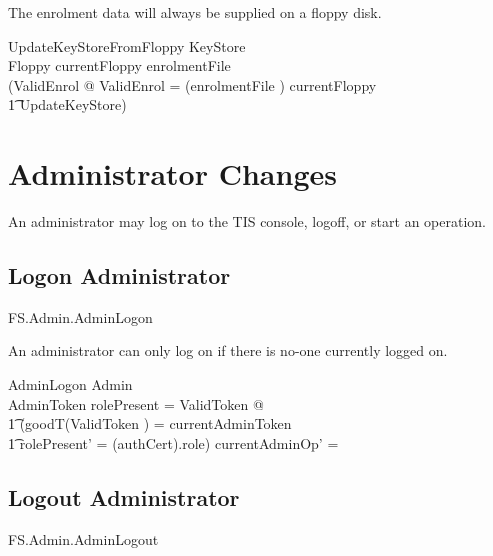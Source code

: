The enrolment data will always be supplied on a floppy disk.

\begin{schema}{UpdateKeyStoreFromFloppy}
        \Delta KeyStore
\\      Floppy
\where
        currentFloppy \in \ran enrolmentFile
\\
        (\exists ValidEnrol @ \theta ValidEnrol = (enrolmentFile \inv) currentFloppy
\\ \t1  \land UpdateKeyStore)   
\also
\end{schema}

\section{Administrator Changes}
An administrator may log on to the TIS console, logoff, or start an
operation.

\subsection{Logon Administrator}

\begin{traceunit}{FS.Admin.AdminLogon}
\end{traceunit}

An administrator can only log on if there is no-one currently logged on.

\begin{schema}{AdminLogon}
        \Delta Admin
\\      AdminToken
\where
        rolePresent = \Nil
\also
        \exists ValidToken @
\\ \t1  (goodT(\theta ValidToken )  = currentAdminToken
\\ \t1  \land \The rolePresent' = (\The authCert).role)
\also
        currentAdminOp' = \Nil
\end{schema}

\subsection{Logout Administrator}

\begin{traceunit}{FS.Admin.AdminLogout}
\end{traceunit}

